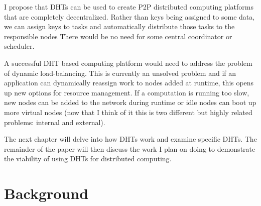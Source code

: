 \documentclass[10pt,letterpaper,twoside]{report}
\begin{document}
I propose that DHTs can be used to create P2P distributed computing platforms that are completely decentralized.
Rather than keys being assigned to some data, we can assign keys to tasks and automatically distribute those tasks to the responsible nodes
There would be no need for some central coordinator or scheduler.

A successful DHT based computing platform would need to address the problem of dynamic load-balancing.
This is currently an unsolved problem and if an application can dynamically reassign work to nodes added at runtime, this opens up new options for resource management.
If a computation  is running too slow, new nodes can be added to the network  during runtime or idle nodes can boot up more virtual nodes (now that I think of it this is two different but highly related problems: internal and external).


The next chapter will delve into how DHTs work and examine specific DHTs.
The remainder of the paper will then discuss the work I plan on doing to demonstrate the viability of using DHTs for distributed computing.





\chapter{Background}
\label{chapter:background}

\end{document}
